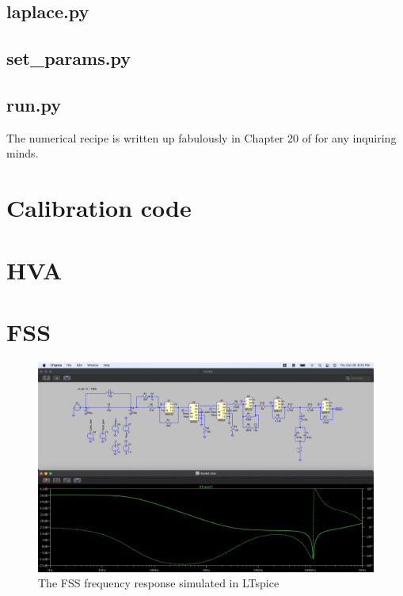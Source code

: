 \subsection{laplace.py}


\subsection{set\_params.py}


\subsection{run.py}
The numerical recipe is written up fabulously in Chapter 20  of \cite{Press:2007} for any inquiring minds.


\section{Calibration code}\label{sec:calibrationcode}


\section{HVA}

\section{FSS}

\begin{figure}[H]
  \begin{center}
    \includegraphics[width=\textwidth]{figs/ALGAAS/tfs/spice_FSS_tf.pdf}
    \caption{The FSS frequency response simulated in LTspice}
  \end{center}
  \label{fig:spiceFSS}
\end{figure}


